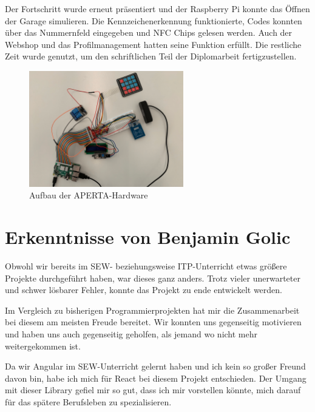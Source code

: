 Der Fortschritt wurde erneut präsentiert und der Raspberry Pi konnte das Öffnen der Garage simulieren. Die Kennzeichenerkennung funktionierte, Codes konnten über das Nummernfeld eingegeben und NFC Chips gelesen werden. Auch der Webshop und das Profilmanagement hatten seine Funktion erfüllt. Die restliche Zeit wurde genutzt, um den schriftlichen Teil der Diplomarbeit fertigzustellen. 

\begin{figure}[H]
    \centering
    \includegraphics[width=0.6\textwidth]{pics/Aufbau.png}
    \caption{Aufbau der APERTA-Hardware}
  \end{figure}

\newpage
\section{Erkenntnisse von Benjamin Golic}
Obwohl wir bereits im SEW- beziehungsweise ITP-Unterricht etwas größere Projekte durchgeführt haben, war dieses ganz anders. Trotz vieler unerwarteter und schwer lösbarer Fehler, konnte das Projekt zu ende entwickelt werden. 

Im Vergleich zu bisherigen Programmierprojekten hat mir die Zusammenarbeit bei diesem am meisten Freude bereitet. Wir konnten uns gegenseitig motivieren und haben uns auch gegenseitig geholfen, als jemand wo nicht mehr weitergekommen ist. 

Da wir Angular im SEW-Unterricht gelernt haben und ich kein so großer Freund davon bin, habe ich mich für React bei diesem Projekt entschieden. Der Umgang mit dieser Library gefiel mir so gut, dass ich mir vorstellen könnte, mich darauf für das spätere Berufsleben zu spezialisieren. 
\newpage

